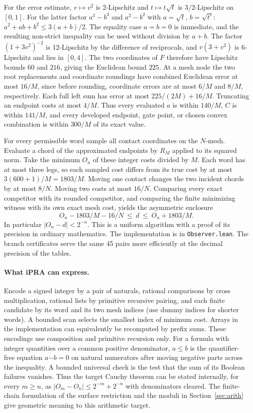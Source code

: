 For the error estimate, $v\mapsto v^2$ is 2-Lipschitz and
$t\mapsto t\sqrt t$ is $3/2$-Lipschitz on $[0,1]$.
For the latter factor $a^3-b^3$ and $a^2-b^2$ with
$a=\sqrt t$, $b=\sqrt{t'}$:
$a^2+ab+b^2\le 3(a+b)/2$. The equality case $a=b=0$ is immediate,
and the resulting non-strict inequality can be used without division by
$a+b$. The factor $(1+3v^2)^{-2}$ is 12-Lipschitz by the difference
of reciprocals, and $v(3+v^2)$ is 6-Lipschitz and lies in $[0,4]$.
The two coordinates of $F$ therefore have Lipschitz bounds $60$ and
$216$, giving the Euclidean bound $225$.
At a mesh node the two root replacements and coordinate roundings have
combined Euclidean error at most $16/M$, since before rounding, coordinate
errors are at most $6/M$ and $8/M$, respectively. Each full left sum
has error at most $225/(2M)+16/M$. Truncating an endpoint costs at
most $4/M$. Thus every evaluated $a$ is within $140/M$,
$C$ is within $141/M$, and every developed endpoint, gate point, or
chosen convex combination is within $300/M$ of its exact value.

For every permissible word sample all contact coordinates on the
$N$-mesh. Evaluate a chord of the approximated endpoints by $R_M$
applied to its squared norm. Take the minimum $O_n$ of these integer
costs divided by $M$. Each word has at most three legs, so each sampled
cost differs from its true cost by at most $3(600+1)/M=1803/M$.
Moving one contact changes the two incident chords by at most $8/N$.
Moving two costs at most $16/N$. Comparing every exact competitor
with its rounded competitor, and comparing the finite minimizing
witness with its own exact mesh cost, yields the asymmetric enclosure
\[
 O_n - 1803/M -16/N\ \le\ d\ \le\ O_n+1803/M .
\]
In particular $|O_n-d|<2^{-n}$. This is a uniform algorithm with a
proof of its precision in ordinary mathematics. The implementation is
in \texttt{Observer.lean}. The branch certificates serve the same 45
pairs more efficiently at the decimal precision of the tables.

\paragraph{What iPRA can express.}
Encode a signed integer by a pair of naturals, rational comparisons
by cross multiplication, rational lists by primitive recursive pairing,
and each finite candidate by its word and its two mesh indices (use
dummy indices for shorter words). A bounded scan selects the smallest
index of minimum cost. Arrays in the implementation can equivalently be
recomputed by prefix sums. These encodings use composition and primitive
recursion only. For a formula with integer quantities over a common
positive denominator, $a\le b$ is the quantifier-free equation
$a\mathbin{\dot-}b=0$ on natural numerators after moving negative
parts across the inequality. A bounded universal check is the test
that the sum of its Boolean failures vanishes. Thus the target Cauchy
theorem can be stated internally, for every $m\ge n$, as
$|O_m-O_n|\le2^{-m}+2^{-n}$ with denominators cleared.
The finite-chain formulation of the surface restriction and the moduli in Section~\ref{sec:arith} give geometric meaning to this arithmetic target.

